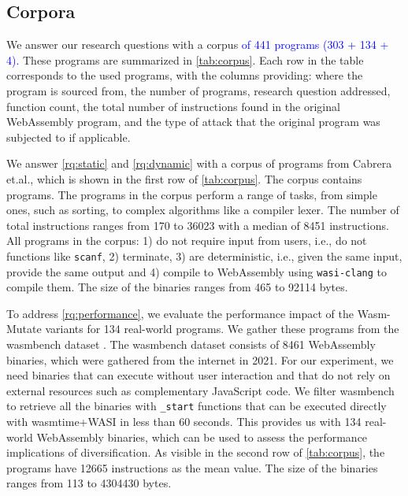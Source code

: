 \documentclass[a4paper,fleqn]{cas-dc}
\newcommand{\tool}{{\sc Wasm-Mutate}\xspace}
\newcommand{\Wasm}{WebAssembly\xspace}
\newcommand{\wasm}{\Wasm}
\newcommand{\etal}{et.al.\xspace}
\newcommand{\ie}{i.e.,\xspace}
\newenvironment{revision1}{\color{blue}}{}
\newcommand{\revision}[1]{\textcolor{blue}{#1}}
\begin{document}
\subsection{Corpora}
\label{sec:corpus}



We answer our research questions with a corpus \revision{ of 441 programs (303 + 134 + 4).}
These programs are summarized in \autoref{tab:corpus}.
Each row in the table corresponds to the used programs, with the columns providing: where the program is sourced from, the number of programs, research question addressed, function count, the total number of instructions found in the original \wasm program, and the type of attack that the original program was subjected to if applicable.

We answer \ref{rq:static} and \ref{rq:dynamic} with a corpus of programs from Cabrera \etal \cite{arteaga2020crow}, which is shown in the first row of \autoref{tab:corpus}.
The corpus contains \nProgramsRosetta programs.
The programs in the corpus perform a range of tasks, from simple ones, such as sorting, to complex algorithms like a compiler lexer. 
The number of total instructions ranges from 170 to 36023 with a median of 8451 instructions.
All programs in the corpus: 
1) do not require input from users, \ie do not functions like \texttt{scanf}, 2) terminate, 3) are deterministic, \ie given the same input, provide the same output and 4) compile to \wasm using \texttt{wasi-clang} to compile them.
The size of the binaries ranges from 465 to 92114 bytes. 

\begin{revision1}
To address \ref{rq:performance}, we evaluate the performance impact of the \tool variants for 134 real-world programs. 
We gather these programs from the wasmbench dataset \cite{hilbig2021empirical}. 
The wasmbench dataset consists of 8461 \Wasm binaries, which were gathered from the internet in 2021. 
For our experiment, we need binaries that can execute without user interaction and that do not rely on external resources such as complementary JavaScript code. 
We filter wasmbench to retrieve all the binaries with \texttt{_start} functions that can be executed directly with wasmtime+WASI in less than 60 seconds. 
This provides us with  134 real-world \Wasm binaries, which can be used to assess the performance implications of diversification. 
As visible in the second row of \autoref{tab:corpus}, the programs have 12665 instructions as the mean value.
The size of the binaries ranges from 113 to 4304430 bytes. 
\end{revision1}
\end{document}
